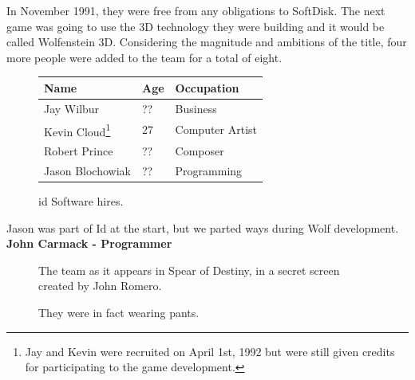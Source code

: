 \documentclass[book.tex]{subfiles}
\begin{document}
In November 1991, they were free from any obligations to SoftDisk. The next game was going to use the 3D technology they were building and it would be called Wolfenstein 3D. Considering the magnitude and ambitions of the title, four more people were added to the team for a total of eight.\\
 \begin{figure}[H]
\centering  
\begin{tabularx}{\textwidth}{ X  X  X  }
  \toprule
  \textbf{Name} &  \textbf{Age} & \textbf{Occupation} \\
  \toprule 
   Jay Wilbur & ?? &  Business\\
   Kevin Cloud\footnote{Jay and Kevin were recruited on April 1st, 1992 but were still given credits for participating to the game development.} & 27 &  Computer Artist\\
   Robert Prince & ?? &  Composer\\
   Jason Blochowiak & ?? &   Programming\\
     \toprule
\end{tabularx}
\caption{id Software hires.}\label{fig:Id Software hires}
\end{figure}

\begin{fancyquotes}
Jason was part of Id at the start, but we parted ways during Wolf development.
 \bigskip \\
\textbf{John Carmack - Programmer}
 \end{fancyquotes}
 
\begin{figure}[H]
\centering
\caption{The team as it appears in Spear of Destiny, in a secret screen created by John Romero.}
\label{fig:id_team_1993}
\end{figure}
 
\begin{figure}[H]
\centering
\caption{They were in fact wearing pants.}
\label{fig:id_team_1993}
\end{figure}
\end{document}
